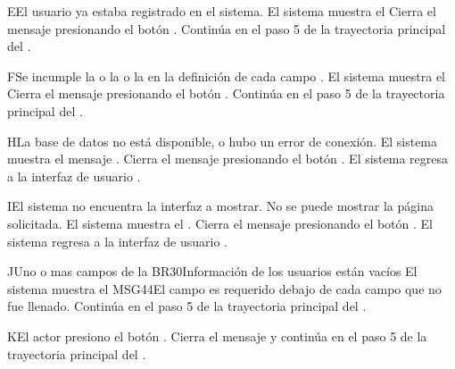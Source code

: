 \begin{UCtrayectoriaA}{E}{El usuario ya estaba registrado en el sistema.}
	\UCpaso El sistema muestra el  
	\UCpaso[\UCactor] Cierra el mensaje presionando el botón .
	\UCpaso Continúa en el paso 5 de la trayectoria principal del .
\end{UCtrayectoriaA}

\begin{UCtrayectoriaA}{F}{Se incumple la  o la   o la   en la definición de cada campo   .}
	\UCpaso El sistema muestra el 
	\UCpaso[\UCactor] Cierra el mensaje presionando el botón .
	\UCpaso Continúa en el paso 5 de la trayectoria principal del .
\end{UCtrayectoriaA}



\begin{UCtrayectoriaA}{H}{La base de datos no está disponible, o hubo un error de conexión.}
	\UCpaso El sistema muestra el mensaje .
	\UCpaso[\UCactor] Cierra el mensaje presionando el botón .
	\UCpaso El sistema regresa a la interfaz de usuario .
\end{UCtrayectoriaA}

\begin{UCtrayectoriaA}{I}{El sistema no encuentra la interfaz a mostrar.}
	\UCpaso No se puede mostrar la página solicitada.
	\UCpaso El sistema muestra el .
	\UCpaso[\UCactor] Cierra el mensaje presionando el botón .
	\UCpaso El sistema regresa a la interfaz de usuario .
\end{UCtrayectoriaA}
\begin{UCtrayectoriaA}{J}{Uno o mas campos de la {BR30}{Información de los usuarios}  están vacíos }
	\UCpaso El sistema muestra el {MSG44}{El campo es requerido} debajo de cada campo que no fue llenado. 
	\UCpaso	Continúa en el paso 5 de la trayectoria principal del .
\end{UCtrayectoriaA}
\begin{UCtrayectoriaA}{K}{El actor presiono el botón .}
	\UCpaso Cierra el mensaje y continúa en el paso 5 de la trayectoria principal del .	
\end{UCtrayectoriaA}
